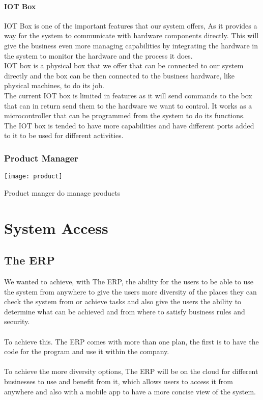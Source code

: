 \subsubsection{IOT Box}
IOT Box is one of the important features that our system offers, As it provides a way for the system to
communicate with hardware components directly. This will give the business even more managing
capabilities by integrating the hardware in the system to monitor the hardware and the process it does.\\
IOT box is a physical box that we offer that can be connected to our system directly and the box can
be then connected to the business hardware, like physical machines, to do its job.\\
The current IOT box is limited in features as it will send commands to the box that can in return send
them to the hardware we want to control. It works as a microcontroller that can be programmed from
the system to do its functions.\\
The IOT box is tended to have more capabilities and have different ports added to it to be used for
different activities.


\break
\subsection{Product Manager}

\begin{center}
    \texttt{[image: product]}
\end{center}

Product manger do manage products

\chapter{System Access}

\section{The ERP}
We wanted to achieve, with The ERP, the ability for the users to be able to use the system from
anywhere to give the users more diversity of the places they can check the system from or achieve
tasks and also give the users the ability to determine what can be achieved and from where to satisfy
business rules and security.\\\\
To achieve this. The ERP comes with more than one plan, the first is to have the code for the program
and use it within the company.\\\\
To achieve the more diversity options, The ERP will be on the cloud for different businesses to use
and benefit from it, which allows users to access it from anywhere and also with a mobile app to have
a more concise view of the system.

